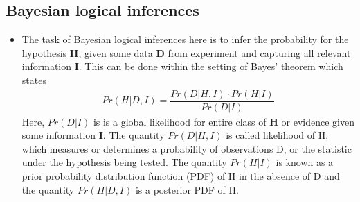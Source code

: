 \documentclass{article}
\begin{document}
\subsection{Bayesian logical inferences}
\begin{itemize}

\item The task of Bayesian logical inferences here is to infer the probability for the hypothesis \textbf{H}, given some data \textbf{D} from experiment and capturing all relevant information \textbf{I}. This
can be done within the setting of Bayes’ theorem which states  
\begin{align*}      
Pr(H|D,I) = \dfrac{Pr(D|H,I)\cdot Pr(H|I)}{Pr(D|I)} 
\end{align*} 
Here, $ 	Pr(D|I) $ is is a global likelihood for entire class of \textbf{H} or evidence given some information \textbf{I}. The quantity $ Pr(D|H,I) $ is called likelihood of H, which measures or determines a probability of observations D, or the statistic under the hypothesis being tested. The quantity $ Pr(H|I) $ is known as a prior probability distribution function (PDF) of H in the absence of D and the quantity $ Pr(H|D,I) $ is a posterior PDF of H. 
\end{itemize}
\end{document}
